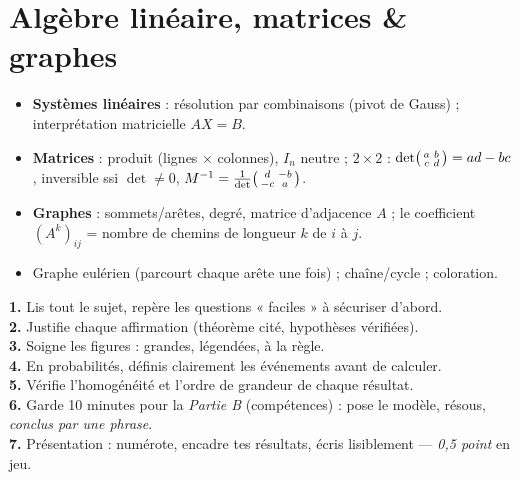 \section{Algèbre linéaire, matrices \& graphes}

\begin{itemize}
\item \textbf{Systèmes linéaires} : résolution par combinaisons (pivot de Gauss) ; interprétation matricielle $AX=B$.
\item \textbf{Matrices} : produit (lignes $\times$ colonnes), $I_n$ neutre ; $2\times2$ : $\det\begin{psmallmatrix}a&b\\c&d\end{psmallmatrix}=ad-bc$,
      inversible ssi $\det\ne0$, $M^{-1}=\frac1{\det}\begin{psmallmatrix}d&-b\\-c&a\end{psmallmatrix}$.
\item \textbf{Graphes} : sommets/arêtes, degré, matrice d'adjacence $A$ ; le coefficient $(A^k)_{ij}$ = nombre de chemins de longueur $k$ de $i$ à $j$.
\item Graphe eulérien (parcourt chaque arête une fois) ; chaîne/cycle ; coloration.
\end{itemize}

\begin{synthese}
\textbf{1.} Lis tout le sujet, repère les questions « faciles » à sécuriser d'abord.\\
\textbf{2.} Justifie chaque affirmation (théorème cité, hypothèses vérifiées).\\
\textbf{3.} Soigne les figures : grandes, légendées, à la règle.\\
\textbf{4.} En probabilités, définis clairement les événements avant de calculer.\\
\textbf{5.} Vérifie l'homogénéité et l'ordre de grandeur de chaque résultat.\\
\textbf{6.} Garde 10 minutes pour la \emph{Partie B} (compétences) : pose le modèle, résous, \emph{conclus par une phrase}.\\
\textbf{7.} Présentation : numérote, encadre tes résultats, écris lisiblement — \emph{0,5 point} en jeu.
\end{synthese}
